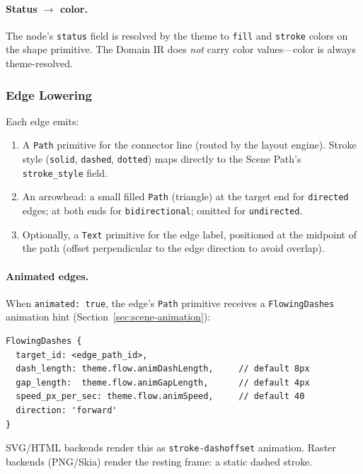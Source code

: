 \paragraph{Status $\rightarrow$ color.}
The node's \texttt{status} field is resolved by the theme to \texttt{fill} and \texttt{stroke} colors on the shape primitive. The Domain IR does \emph{not} carry color values---color is always theme-resolved.

\subsubsection{Edge Lowering}

Each edge emits:

\begin{enumerate}
  \item A \texttt{Path} primitive for the connector line (routed by the layout engine). Stroke style (\texttt{solid}, \texttt{dashed}, \texttt{dotted}) maps directly to the Scene Path's \texttt{stroke\_style} field.
  
  \item An arrowhead: a small filled \texttt{Path} (triangle) at the target end for \texttt{directed} edges; at both ends for \texttt{bidirectional}; omitted for \texttt{undirected}.
  
  \item Optionally, a \texttt{Text} primitive for the edge label, positioned at the midpoint of the path (offset perpendicular to the edge direction to avoid overlap).
\end{enumerate}

\paragraph{Animated edges.}
When \texttt{animated: true}, the edge's \texttt{Path} primitive receives a \texttt{FlowingDashes} animation hint (Section~\ref{sec:scene-animation}):

\begin{Verbatim}[frame=single,fontsize=\small]
FlowingDashes {
  target_id: <edge_path_id>,
  dash_length: theme.flow.animDashLength,     // default 8px
  gap_length:  theme.flow.animGapLength,      // default 4px
  speed_px_per_sec: theme.flow.animSpeed,     // default 40
  direction: 'forward'
}
\end{Verbatim}

SVG/HTML backends render this as \texttt{stroke-dashoffset} animation. Raster backends (PNG/Skia) render the resting frame: a static dashed stroke.

